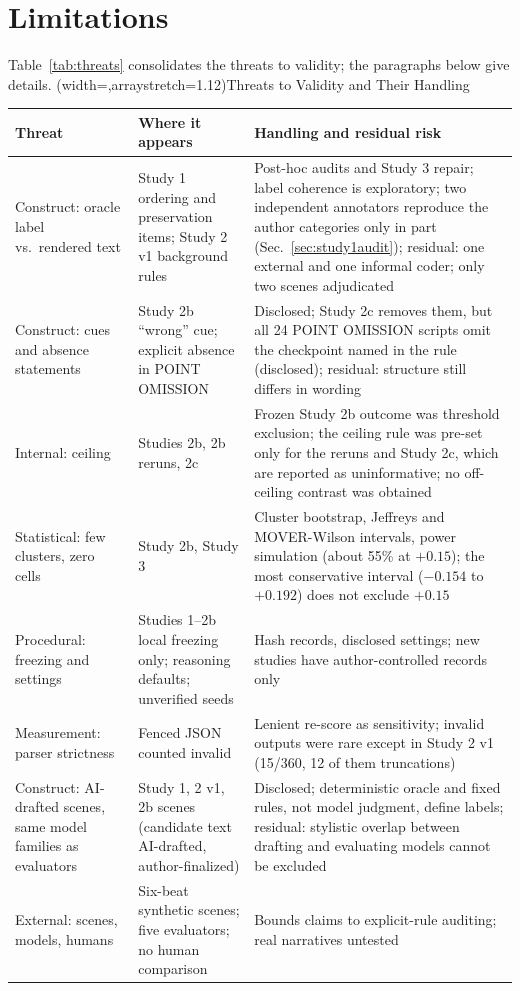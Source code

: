 \documentclass{ieeeaccess}
\begin{document}
\section{Limitations}
Table~\ref{tab:threats} consolidates the threats to validity; the paragraphs below give details.
\Table[t](width=\textwidth,arraystretch=1.12){Threats to Validity and Their Handling \label{tab:threats}}{\setlength{\tabcolsep}{4pt}\begin{tabularx}{\textwidth}{@{}>{\raggedright\arraybackslash}p{}>{\raggedright\arraybackslash}p{}L@{}}
\toprule
Threat & Where it appears & Handling and residual risk\\
\midrule
Construct: oracle label vs.\ rendered text & Study 1 ordering and preservation items; Study 2 v1 background rules & Post-hoc audits and Study 3 repair; label coherence is exploratory; two independent annotators reproduce the author categories only in part (Sec.~\ref{sec:study1audit}); residual: one external and one informal coder; only two scenes adjudicated\\
Construct: cues and absence statements & Study 2b ``wrong'' cue; explicit absence in POINT OMISSION & Disclosed; Study 2c removes them, but all 24 POINT OMISSION scripts omit the checkpoint named in the rule (disclosed); residual: structure still differs in wording\\
Internal: ceiling & Studies 2b, 2b reruns, 2c & Frozen Study 2b outcome was threshold exclusion; the ceiling rule was pre-set only for the reruns and Study 2c, which are reported as uninformative; no off-ceiling contrast was obtained\\
Statistical: few clusters, zero cells & Study 2b, Study 3 & Cluster bootstrap, Jeffreys and MOVER-Wilson intervals, power simulation (about 55\% at $+0.15$); the most conservative interval ($-0.154$ to $+0.192$) does not exclude $+0.15$\\
Procedural: freezing and settings & Studies 1--2b local freezing only; reasoning defaults; unverified seeds & Hash records, disclosed settings; new studies have author-controlled records only\\
Measurement: parser strictness & Fenced JSON counted invalid & Lenient re-score as sensitivity; invalid outputs were rare except in Study 2 v1 (15/360, 12 of them truncations)\\
Construct: AI-drafted scenes, same model families as evaluators & Study 1, 2 v1, 2b scenes (candidate text AI-drafted, author-finalized) & Disclosed; deterministic oracle and fixed rules, not model judgment, define labels; residual: stylistic overlap between drafting and evaluating models cannot be excluded\\
External: scenes, models, humans & Six-beat synthetic scenes; five evaluators; no human comparison & Bounds claims to explicit-rule auditing; real narratives untested\\
\bottomrule
\end{tabularx}}
\end{document}
